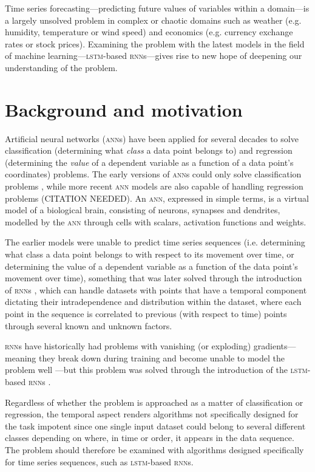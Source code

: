 Time series forecasting---predicting future values of variables within a
domain---is a largely unsolved problem in complex or chaotic domains such as
weather (e.g. humidity, temperature or wind speed) and economics (e.g. currency
exchange rates or stock prices).  Examining the problem with the latest models
in the field of machine learning---\textsc{lstm}-based \textsc{rnn}s---gives
rise to new hope of deepening our understanding of the problem.

\section{Background and motivation}
Artificial neural networks (\textsc{ann}s) have been applied for several decades
to solve classification (determining what \textit{class} a data point belongs
to) and regression (determining the \textit{value} of a dependent variable as a
function of a data point's coordinates) problems.  The early versions of
\textsc{ann}s could only solve classification problems \citep{rosenblatt1958},
while more recent \textsc{ann} models are also capable of handling regression
problems (CITATION NEEDED).  An \textsc{ann}, expressed in simple terms, is a
virtual model of a biological brain, consisting of neurons, synapses and
dendrites, modelled by the \textsc{ann} through cells with scalars, activation
functions and weights.

The earlier models were unable to predict time series sequences (i.e.
determining what class a data point belongs to with respect to its movement over
time, or determining the value of a dependent variable as a function of the data
point's movement over time), something that was later solved through the
introduction of \textsc{rnn}s \citep*{rumelhart1986}, which can handle datasets
with points that have a temporal component dictating their intradependence and
distribution within the dataset, where each point in the sequence is correlated
to previous (with respect to time) points through several known and unknown
factors.

\textsc{rnn}s have historically had problems with vanishing (or exploding)
gradients---meaning they break down during training and become unable to model
the problem well \citep{pascanu2012}---but this problem was solved through the
introduction of the \textsc{lstm}-based \textsc{rnn}s \citep*{hochreiter1997}.

Regardless of whether the problem is approached as a matter of classification or
regression, the temporal aspect renders algorithms not specifically designed for
the task impotent since one single input dataset could belong to several
different classes depending on where, in time or order, it appears in the data
sequence.  The problem should therefore be examined with algorithms designed
specifically for time series sequences, such as \textsc{lstm}-based
\textsc{rnn}s.

